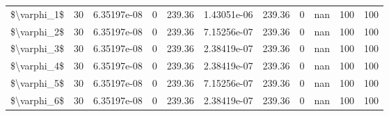\begin{tabular}{lrrrrrrrrrr}
 \$\textbackslash{}varphi\_1\$ &  30 & 6.35197e-08 & 0        &    239.36   &    1.43051e-06 &     239.36   &     0        &         nan & 100           & 100           \\
 \$\textbackslash{}varphi\_2\$ &  30 & 6.35197e-08 & 0        &    239.36   &    7.15256e-07 &     239.36   &     0        &         nan & 100           & 100           \\
 \$\textbackslash{}varphi\_3\$ &  30 & 6.35197e-08 & 0        &    239.36   &    2.38419e-07 &     239.36   &     0        &         nan & 100           & 100           \\
 \$\textbackslash{}varphi\_4\$ &  30 & 6.35197e-08 & 0        &    239.36   &    2.38419e-07 &     239.36   &     0        &         nan & 100           & 100           \\
 \$\textbackslash{}varphi\_5\$ &  30 & 6.35197e-08 & 0        &    239.36   &    7.15256e-07 &     239.36   &     0        &         nan & 100           & 100           \\
 \$\textbackslash{}varphi\_6\$ &  30 & 6.35197e-08 & 0        &    239.36   &    2.38419e-07 &     239.36   &     0        &         nan & 100           & 100           \\
\hline
\end{tabular}
